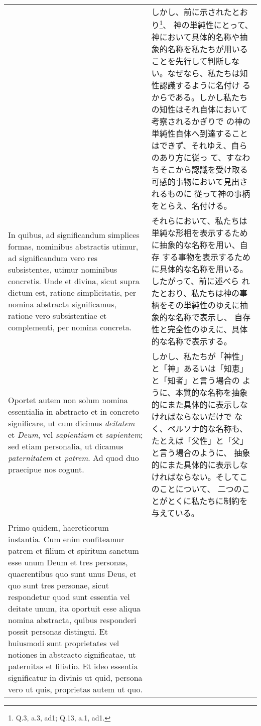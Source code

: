 \documentclass[10pt]{jsarticle} %
\begin{document}
\begin{longtable}{p{21em}p{21em}}
&

しかし、前に示されたとおり\footnote{Q.3, a.3, ad1; Q.13, a.1, ad1.}、
 神の単純性にとって、神において具体的名称や抽象的名称を私たちが用いる
 ことを先行して判断しない。なぜなら、私たちは知性認識するように名付け
 るからである。しかし私たちの知性はそれ自体において考察されるかぎりで
 の神の単純性自体へ到達することはできず、それゆえ、自らのあり方に従っ
 て、すなわちそこから認識を受け取る可感的事物において見出されるものに
 従って神の事柄をとらえ、名付ける。

\\

In quibus, ad significandum simplices formas,
nominibus abstractis utimur, ad significandum vero res subsistentes,
utimur nominibus concretis. Unde et divina, sicut supra dictum est,
ratione simplicitatis, per nomina abstracta significamus, ratione vero
subsistentiae et complementi, per nomina concreta. 

&

それらにおいて、私たちは単純な形相を表示するために抽象的な名称を用い、自存
 する事物を表示するために具体的な名称を用いる。したがって、前に述べら
 れたとおり、私たちは神の事柄をその単純性のゆえに抽象的な名称で表示し、
 自存性と完全性のゆえに、具体的な名称で表示する。



\\


Oportet autem non
solum nomina essentialia in abstracto et in concreto significare, ut
cum dicimus {\itshape deitatem} et {\itshape Deum}, vel {\itshape sapientiam} et {\itshape sapientem}; sed etiam
personalia, ut dicamus {\itshape paternitatem} et {\itshape patrem}. Ad quod duo praecipue
nos cogunt. 


&

しかし、私たちが「神性」と「神」あるいは「知恵」と「知者」と言う場合の
 ように、本質的な名称を抽象的にまた具体的に表示しなければならないだけで
 なく、ペルソナ的な名称も、たとえば「父性」と「父」と言う場合のように、
 抽象的にまた具体的に表示しなければならない。そしてこのことについて、
 二つのことがとくに私たちに制約を与えている。

\\

Primo quidem, haereticorum instantia. Cum enim confiteamur
patrem et filium et spiritum sanctum esse unum Deum et tres personas,
quaerentibus quo sunt unus Deus, et quo sunt tres personae, sicut
respondetur quod sunt essentia vel deitate unum, ita oportuit esse
aliqua nomina abstracta, quibus responderi possit personas
distingui. Et huiusmodi sunt proprietates vel notiones in abstracto
significatae, ut paternitas et filiatio. Et ideo essentia significatur
in divinis ut quid, persona vero ut quis, proprietas autem ut
quo. 


\end{longtable}
\end{document}
